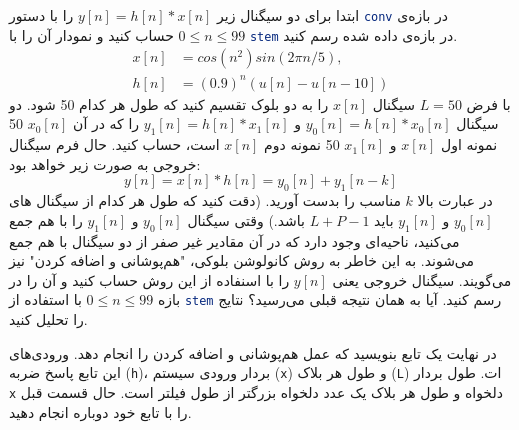 \documentclass{utsignal}
\begin{document}
	ابتدا برای دو سیگنال زیر $y[n]=h[n]*x[n]$ را با دستور \lstinline[language=Octave]{conv}  در بازه‌ی $0\le n \le 99$ حساب کنید و نمودار آن را با \lstinline[language=Octave]{stem} در بازه‌ی داده شده رسم کنید.
	\begin{align*}
	x[n] &= cos(n^2)sin(2\pi n/5),\\
	h[n]‌&= (0.9)^n(u[n]-u[n-10])
	\end{align*}
	با فرض $L=50$ سیگنال $x[n]$ را به دو بلوک تقسیم کنید که طول هر کدام 50 شود. دو سیگنال $y_0[n]=h[n]*x_0[n]$ و $y_1[n]=h[n]*x_1[n]$ را که در آن $x_0[n]$ 50 نمونه اول $x[n]$ و $x_1[n]$ 50 نمونه دوم $x[n]$ است، حساب کنید. حال فرم سیگنال خروجی به صورت زیر خواهد بود:
	$$y[n]=x[n]*h[n] = y_0[n] + y_1[n-k]$$
	در عبارت بالا $k$ مناسب را بدست آورید. (دقت کنید که طول هر کدام از سیگنال های $y_0[n]$ و $y_1[n]$ باید $L+P-1$ باشد.) وقتی سیگنال $y_0[n]$ و $y_1[n]$ را با هم جمع می‌کنید، ناحیه‌ای وجود دارد که در آن مقادیر غیر صفر از دو سیگنال با هم جمع می‌شوند. به این خاطر به روش کانولوشن بلوکی، "هم‌پوشانی و اضافه کردن" نیز می‌گویند. سیگنال خروجی یعنی $y[n]$ را با اسنفاده از این روش حساب کنید و آن را در بازه $0\le n \le 99$ با استفاده از \lstinline[language=Octave]{stem} رسم کنید. آیا به همان نتیجه قبلی می‌رسید؟ نتایج را تحلیل کنید.
	
	در نهایت یک تابع بنویسید که عمل هم‌پوشانی و اضافه کردن را انجام دهد. ورودی‌های این تابع پاسخ ضربه (\lstinline[language=Octave]{h})، بردار ورودی سیستم (\lstinline[language=Octave]{x}) و طول هر بلاک (\lstinline[language=Octave]{L}) ات. طول بردار \lstinline[language=Octave]{x} دلخواه و طول هر بلاک یک عدد دلخواه بزرگتر از طول فیلتر است. حال قسمت قبل را با تابع خود دوباره انجام دهید.
	
\end{document}
